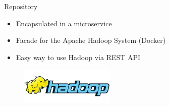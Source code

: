 \begin{frame}{Repository}
	\begin{itemize}
		\item Encapsulated in a microservice
		\item Facade for the Apache Hadoop System (Docker)
		\item Easy way to use Hadoop via REST API
	\end{itemize}

	\begin{figure}[htbp]
  		\centering
  		\includegraphics[width=0.4\textwidth]{figures/hadoop}
	\end{figure}
\end{frame}
